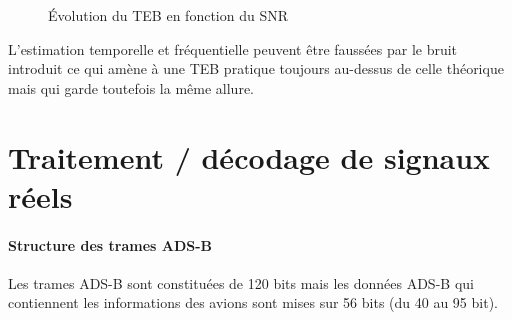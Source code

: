 \documentclass[a4paper, 10pt]{article}
\begin{document}
\newpage
    \begin{figure}[h!]
        \centering
        
        \caption{Évolution du TEB en fonction du SNR}
    \end{figure}

    L'estimation temporelle et fréquentielle peuvent être faussées par le bruit introduit ce qui amène à une TEB pratique toujours au-dessus de celle théorique mais qui garde toutefois la même allure.

\part{Traitement / décodage de signaux réels}
    \setcounter{section}{2}
    \setcounter{subsection}{0}
    
    \subsection{Structure des trames ADS-B}
    Les trames ADS-B sont constituées de 120 bits mais les données ADS-B qui contiennent les informations des avions sont mises sur 56 bits (du 40 au 95 bit).
    
\end{document}
